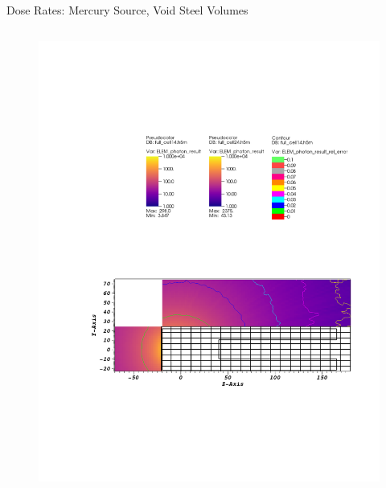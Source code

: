 \documentclass{beamer}
\begin{document}
\begin{frame}{Dose Rates: Mercury Source, Void Steel Volumes}
\begin{columns}[T]
        \begin{figure}
                \includegraphics[scale=0.49,trim={20cm 16cm 7cm 5cm},clip]{figs/dose_mer_cell_void.pdf}
        \end{figure}

\end{columns}
\end{frame}
\end{document}
